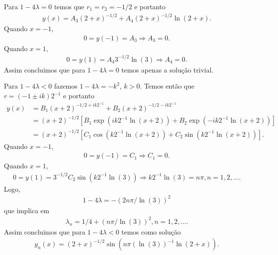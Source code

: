 \documentclass[a4paper,12pt, leqno, answers]{exam}
\begin{document}
\begin{questions}
\begin{parts}
\begin{solution}
            Para $1 - 4 \lambda = 0$ temos que $r_1 = r_2 = -1/2$ e portanto
            \begin{align*}
                y(x) = A_3 (2 + x)^{-1/2} + A_4 (2 + x)^{-1/2} \ln(2 + x).
            \end{align*}
            Quando $x = -1$,
            \begin{align*}
                0 = y(-1) = A_3 \Rightarrow A_3 = 0.
            \end{align*}
            Quando $x = 1$,
            \begin{align*}
                0 = y(1) = A_4 3^{-1/2} \ln(3) \Rightarrow A_4 = 0.
            \end{align*}
            Assim concluimos que para $1 - 4 \lambda = 0$ temos apenas a solu\c{c}\~{a}o trivial.

            Para $1 - 4 \lambda < 0$ fazemos $1 - 4 \lambda = - k^2$, $k > 0$. Temos ent\~{a}o que $r = \left( -1 \pm i k \right) 2^{-1}$ e portanto
            \begin{align*}
                y(x) &= B_1 (x + 2)^{-1/2 + i k 2^{-1}} + B_2 (x + 2)^{-1/2 - i k 2^{-1}} \\
                &= (x + 2)^{-1/2} \left[ B_1 \exp(i k 2^{-1} \ln(x + 2)) + B_2 \exp(-i k 2^{-1} \ln(x + 2)) \right] \\
                &= (x + 2)^{-1/2} \left[ C_1 \cos(k 2^{-1} \ln(x + 2)) + C_2 \sin(k 2^{-1} \ln(x + 2)) \right].
            \end{align*}
            Quando $x = -1$,
            \begin{align*}
                0 = y(-1) = C_1 \Rightarrow C_1 = 0.
            \end{align*}
            Quando $x = 1$,
            \begin{align*}
                0 = y(1) = 3^{-1/2} C_2 \sin(k 2^{-1} \ln(3)) \Rightarrow k 2^{-1} \ln(3) = n \pi, n = 1, 2, \ldots.
            \end{align*}
            Logo,
            \begin{align*}
                1 - 4 \lambda = -\left( 2 n \pi / \ln(3) \right)^2
            \end{align*}
            que implica em
            \begin{align*}
                \lambda_n = 1/4 + \left( n \pi / \ln(3) \right)^2, n = 1, 2, \ldots.
            \end{align*}
            Assim concluimos que para $1 - 4 \lambda < 0$ temos como solu\c{c}\~{a}o
            \begin{align*}
                y_n(x) = (2 + x)^{-1/2} \sin\left( n \pi (\ln(3))^{-1} \ln(2 + x) \right).
            \end{align*}
        \end{solution}


\end{parts}
\end{questions}
\end{document}
